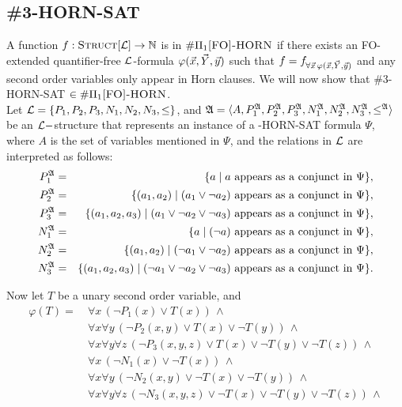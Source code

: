 \subsection{{\sc \#3-HORN-SAT}}
A function $f:\textsc{Struct}[{\cal L}] \to \mathbb{N}$ is in $\#\Pi_1\textsc{[FO]-HORN}$ if there exists an {\sc FO}-extended quantifier-free ${\cal L}$-formula $\varphi(\vec{x},\vec{Y},\vec{y})$ such that $f = f_{\forall \vec{x}\,\varphi(\vec{x},\vec{Y},\vec{y})}$ and any second order variables only appear in Horn clauses. We will now show that {\sc \#3-HORN-SAT} $\in\#\Pi_1\textsc{[FO]-HORN}$.\\

Let ${\cal L} = \{P_1,P_2,P_3,N_1,N_2,N_3,\leq\}$, and ${\frak A} = \langle A, P_1^{\frak A},P_2^{\frak A},P_3^{\frak A},N_1^{\frak A},N_2^{\frak A},N_3^{\frak A}, \leq^{\frak A} \rangle$ be an ${\cal L}-$structure that represents an instance of a {-HORN-SAT} formula $\Psi$, where $A$ is the set of variables mentioned in $\Psi$, and the relations in ${\cal L}$ are interpreted as follows:
\begin{eqnarray*}
P_1^{\frak A} &=& \{a\mid a \mbox{ appears as a conjunct in }\Psi\},\\
P_2^{\frak A} &=& \{(a_1,a_2)\mid (a_1\vee \neg a_2) \mbox{ appears as a conjunct in }\Psi\},\\
P_3^{\frak A} &=& \{(a_1,a_2,a_3)\mid (a_1\vee \neg a_2\vee \neg a_3) \mbox{ appears as a conjunct in }\Psi\},\\
N_1^{\frak A} &=& \{a\mid (\neg a) \mbox{ appears as a conjunct in }\Psi\},\\
N_2^{\frak A} &=& \{(a_1,a_2)\mid (\neg a_1\vee \neg a_2) \mbox{ appears as a conjunct in }\Psi\},\\
N_3^{\frak A} &=& \{(a_1,a_2,a_3)\mid (\neg a_1\vee \neg a_2\vee \neg a_3) \mbox{ appears as a conjunct in }\Psi\}.
\end{eqnarray*}

Now let $T$ be a unary second order variable, and
\begin{align*}
\varphi(T) =\ &\forall x\, (\neg P_1(x) \vee T(x))\,\wedge\\
&\forall x\forall y\, (\neg P_2(x,y) \vee T(x) \vee \neg T(y))\,\wedge\\
&\forall x\forall y\forall z\, (\neg P_3(x,y,z) \vee T(x) \vee \neg T(y) \vee \neg T(z))\,\wedge\\
&\forall x\, (\neg N_1(x) \vee \neg T(x))\,\wedge\\
&\forall x\forall y\, (\neg N_2(x,y) \vee \neg T(x) \vee \neg T(y))\,\wedge\\
&\forall x\forall y\forall z\, (\neg N_3(x,y,z) \vee \neg T(x) \vee \neg T(y) \vee \neg T(z))\,\wedge
\end{align*}

